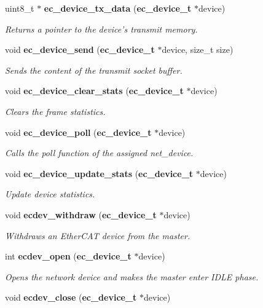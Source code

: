 \begin{DoxyCompactItemize}
uint8\-\_\-t $\ast$ {\bf ec\-\_\-device\-\_\-tx\-\_\-data} ({\bf ec\-\_\-device\-\_\-t} $\ast$device)
\begin{DoxyCompactList}\small\item\em \-Returns a pointer to the device's transmit memory. \end{DoxyCompactList}\item 
void {\bf ec\-\_\-device\-\_\-send} ({\bf ec\-\_\-device\-\_\-t} $\ast$device, size\-\_\-t size)
\begin{DoxyCompactList}\small\item\em \-Sends the content of the transmit socket buffer. \end{DoxyCompactList}\item 
void {\bf ec\-\_\-device\-\_\-clear\-\_\-stats} ({\bf ec\-\_\-device\-\_\-t} $\ast$device)
\begin{DoxyCompactList}\small\item\em \-Clears the frame statistics. \end{DoxyCompactList}\item 
void {\bf ec\-\_\-device\-\_\-poll} ({\bf ec\-\_\-device\-\_\-t} $\ast$device)
\begin{DoxyCompactList}\small\item\em \-Calls the poll function of the assigned net\-\_\-device. \end{DoxyCompactList}\item 
void {\bf ec\-\_\-device\-\_\-update\-\_\-stats} ({\bf ec\-\_\-device\-\_\-t} $\ast$device)
\begin{DoxyCompactList}\small\item\em \-Update device statistics. \end{DoxyCompactList}\item 
void {\bf ecdev\-\_\-withdraw} ({\bf ec\-\_\-device\-\_\-t} $\ast$device)
\begin{DoxyCompactList}\small\item\em \-Withdraws an \-Ether\-C\-A\-T device from the master. \end{DoxyCompactList}\item 
int {\bf ecdev\-\_\-open} ({\bf ec\-\_\-device\-\_\-t} $\ast$device)
\begin{DoxyCompactList}\small\item\em \-Opens the network device and makes the master enter \-I\-D\-L\-E phase. \end{DoxyCompactList}\item 
void {\bf ecdev\-\_\-close} ({\bf ec\-\_\-device\-\_\-t} $\ast$device)

\end{DoxyCompactItemize}
